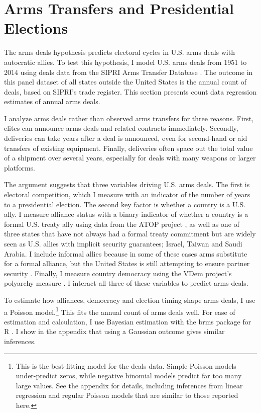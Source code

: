 \documentclass[12pt]{article}
\begin{document}
\section{Arms Transfers and Presidential Elections}


The arms deals hypothesis predicts electoral cycles in U.S. arms deals with autocratic allies.
To test this hypothesis, I model U.S. arms deals from 1951 to 2014 using deals data from the SIPRI Arms Transfer Database \citep{SIPRI2021}.
The outcome in this panel dataset of all states outside the United States is the annual count of deals, based on SIPRI's trade register. 
This section presents count data regression estimates of annual arms deals. 


I analyze arms deals rather than observed arms transfers for three reasons.
First, elites can announce arms deals and related contracts immediately. 
Secondly, deliveries can take years after a deal is announced, even for second-hand or aid transfers of existing equipment. 
Finally, deliveries often space out the total value of a shipment over several years, especially for deals with many weapons or larger platforms. 


The argument suggests that three variables driving U.S. arms deals. 
The first is electoral competition, which I measure with an indicator of the number of years to a presidential election. 
The second key factor is whether a country is a U.S. ally. 
I measure alliance status with a binary indicator of whether a country is a formal U.S. treaty ally using data from the ATOP project \citep{Leedsetal2002}, as well as one of three states that have not always had a formal treaty commitment but are widely seen as U.S. allies with implicit security guarantees; Israel, Taiwan and Saudi Arabia. 
I include informal allies because in some of these cases arms substitute for a formal alliance, but the United States is still attempting to ensure partner security \citep{Yarhi-Miloetal2016}. 
Finally, I measure country democracy using the VDem project's polyarchy measure \citep{Coppedgeetal2008}. 
I interact all three of these variables to predict arms deals. 


To estimate how alliances, democracy and election timing shape arms deals, I use a Poisson model.\footnote{This is the best-fitting model for the deals data. Simple Poisson models under-predict zeros, while negative binomial models predict far too many large values. See the appendix for details, including inferences from linear regression and regular Poisson models that are similar to those reported here.} 
This fits the annual count of arms deals well.
For ease of estimation and calculation, I use Bayesian estimation with the brms package for \textsf{R} \citep{Buerkner2017}. 
I show in the appendix that using a Gaussian outcome gives similar inferences. 
\end{document}
